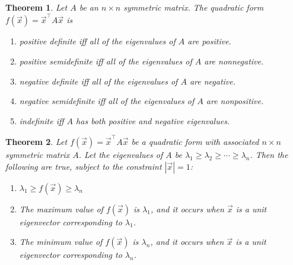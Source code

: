 \documentclass{article}
\theoremstyle{sltheorem}
\newtheorem{theorem}{Theorem}[section]
\begin{document}
\begin{theorem}
    Let $A$ be an $n\times n$ symmetric matrix. The quadratic form $f(\vec x) = \vec x^\intercal A\vec x$ is
    \begin{enumerate}
        \item positive definite iff all of the eigenvalues of $A$ are positive.
        \item positive semidefinite iff all of the eigenvalues of $A$ are nonnegative.
        \item negative definite iff all of the eigenvalues of $A$ are negative.
        \item negative semidefinite iff all of the eigenvalues of $A$ are nonpositive.
        \item indefinite iff $A$ has both positive and negative eigenvalues.
    \end{enumerate}
\end{theorem}
\begin{theorem}
    Let $f(\vec x) = \vec x^\intercal A\vec x$ be a quadratic form with associated $n\times n$ symmetric matrix $A$. Let the eigenvalues of $A$ be $\lambda_1\geq\lambda_2\geq\cdots\geq\lambda_n$. Then the following are true, subject to the constraint $|\vec x|=1$:
    \begin{enumerate}
        \item $\lambda_1\geq f(\vec x)\geq \lambda_n$
        \item The maximum value of $f(\vec x)$ is $\lambda_1$, and it occurs when $\vec x$ is a unit eigenvector corresponding to $\lambda_1$.
        \item The minimum value of $f(\vec x)$ is $\lambda_n$, and it occurs when $\vec x$ is a unit eigenvector corresponding to $\lambda_n$. 
    \end{enumerate}
\end{theorem}
\end{document}
